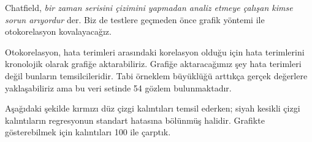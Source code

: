 \documentclass[
]{book}
\newenvironment{Shaded}{\begin{snugshade}}{\end{snugshade}}
\newcommand{\DataTypeTok}[1]{\textcolor[rgb]{0.13,0.29,0.53}{#1}}
\newcommand{\DecValTok}[1]{\textcolor[rgb]{0.00,0.00,0.81}{#1}}
\newcommand{\KeywordTok}[1]{\textcolor[rgb]{0.13,0.29,0.53}{\textbf{#1}}}
\newcommand{\NormalTok}[1]{#1}
\newcommand{\OperatorTok}[1]{\textcolor[rgb]{0.81,0.36,0.00}{\textbf{#1}}}
\newcommand{\StringTok}[1]{\textcolor[rgb]{0.31,0.60,0.02}{#1}}
\begin{document}
Chatfield, \emph{bir zaman serisini çizimini yapmadan analiz etmeye çalışan kimse sorun arıyordur} der. Biz de testlere geçmeden önce grafik yöntemi ile otokorelasyon kovalayacağız.

Otokorelasyon, hata terimleri arasındaki korelasyon olduğu için hata terimlerini kronolojik olarak grafiğe aktarabiliriz. Grafiğe aktaracağımız şey hata terimleri değil bunların temsilcileridir. Tabi örneklem büyüklüğü arttıkça gerçek değerlere yaklaşabiliriz ama bu veri setinde 54 gözlem bulunmaktadır.

Aşağıdaki şekilde kırmızı düz çizgi kalıntıları temsil ederken; siyah kesikli çizgi kalıntıların regresyonun standart hatasına bölünmüş halidir. Grafikte gösterebilmek için kalıntıları 100 ile çarptık.

\begin{Shaded}
\end{Shaded}
\end{document}
